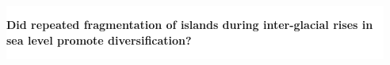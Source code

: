 {
\begin{frame}
    \begin{columns}

        \vspace{6.5cm}

        \ \\


        \vspace{-2cm}

        \colorbox{white}{
            \begin{minipage}[t]{1.0\textwidth}
                \raggedright
                \textbf{Did repeated fragmentation of islands during
                    inter-glacial rises in sea level promote diversification?}
            \end{minipage}
        }
    \end{columns}
\end{frame}
}

